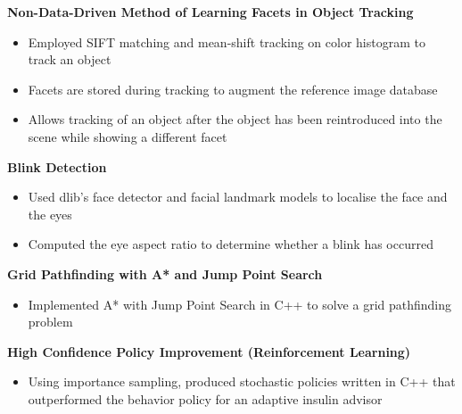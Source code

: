 \documentclass[letterpaper,11pt]{article}
\begin{document}
    \textbf{Non-Data-Driven Method of Learning Facets in Object Tracking} 
    \vspace{-4pt}
        \begin{itemize}
            \item Employed SIFT matching and mean-shift tracking on color histogram to track an object
            \vspace{-5pt}
            \item Facets are stored during tracking to augment the reference image database
            \vspace{-5pt}
            \item Allows tracking of an object after the object has been reintroduced into the scene while showing a different facet
        \end{itemize}
    \vspace{-2pt}
        
    \textbf{Blink Detection} 
    \vspace{-4pt}
        \begin{itemize}
            \item Used dlib's face detector and facial landmark models to localise the face and the eyes
            \vspace{-5pt}
            \item Computed the eye aspect ratio to determine whether a blink has occurred
        \end{itemize}
    \vspace{-2pt}
    
    \textbf{Grid Pathfinding with A* and Jump Point Search} 
    \vspace{-4pt}
        \begin{itemize}
            \item Implemented A* with Jump Point Search in C++ to solve a grid pathfinding problem
        \end{itemize}
    \vspace{-2pt}
    
    \textbf{High Confidence Policy Improvement (Reinforcement Learning)} 
    \vspace{-4pt}
        \begin{itemize}
            \item Using importance sampling, produced stochastic policies written in C++ that outperformed the behavior policy for an adaptive insulin advisor
        \end{itemize}
    \vspace{-2pt}
    
\end{document}
